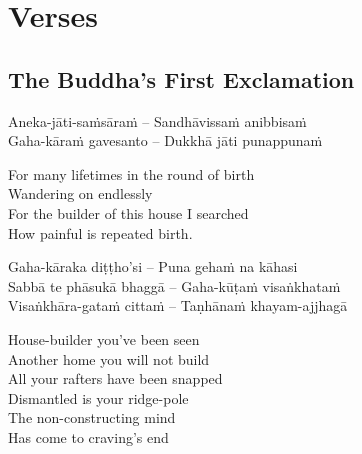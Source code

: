 
\chapter{Verses}

\section{The Buddha's First Exclamation}
\label{buddhas-first-exclamation}

\begin{leader}
\end{leader}

\begin{twochants}
  Aneka-jāti-saṁsāraṁ – Sandhāvissaṁ anibbisaṁ\\
  Gaha-kāraṁ gavesanto – Dukkhā jāti punappunaṁ\\
\end{twochants}

\begin{english}
  For many lifetimes in the round of birth\\
  Wandering on endlessly\\
  For the builder of this house I searched\\
  How painful is repeated birth.
\end{english}

\begin{twochants}
  Gaha-kāraka diṭṭho'si – Puna gehaṁ na kāhasi\\
  Sabbā te phāsukā bhaggā – Gaha-kūṭaṁ visaṅkhataṁ\\
  Visaṅkhāra-gataṁ cittaṁ – Taṇhānaṁ khayam-ajjhagā\\
\end{twochants}

\begin{english}
  House-builder you've been seen\\
  Another home you will not build\\
  All your rafters have been snapped\\
  Dismantled is your ridge-pole\\
  The non-constructing mind\\
  Has come to craving's end
\end{english}

\suttaRef{[Dhp 153-154]}

